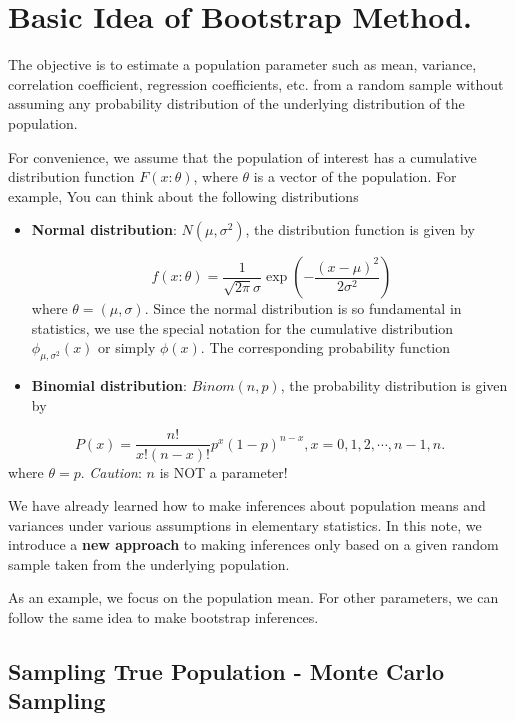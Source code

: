 \documentclass[
]{book}
\begin{document}
\hypertarget{basic-idea-of-bootstrap-method.-1}{%
\section{Basic Idea of Bootstrap Method.}\label{basic-idea-of-bootstrap-method.-1}}

The objective is to estimate a population parameter such as mean, variance, correlation coefficient, regression coefficients, etc. from a random sample without assuming any probability distribution of the underlying distribution of the population.

For convenience, we assume that the population of interest has a cumulative distribution function \(F(x: \theta)\), where \(\theta\) is a vector of the population. For example, You can think about the following distributions

\begin{itemize}
\item
  \textbf{Normal distribution}: \(N(\mu, \sigma^2)\), the distribution function is given by

  \[f(x:\theta) = \frac{1}{\sqrt{2\pi}\sigma}\exp\left(-\frac{(x-\mu)^2}{2\sigma^2}\right)\]
  where \(\theta = (\mu, \sigma)\). Since the normal distribution is so fundamental in statistics, we use the special notation for the cumulative distribution \(\phi_{\mu, \sigma^2}(x)\) or simply \(\phi(x)\). The corresponding probability function
\item
  \textbf{Binomial distribution}: \(Binom(n, p)\), the probability distribution is given by
\end{itemize}

\[ P(x) = \frac{n!}{x!(n-x)!}p^x(1-p)^{n-x}, x = 0, 1, 2, \cdots, n-1, n.\]
where \(\theta = p\). \emph{Caution}: \(n\) is NOT a parameter!

We have already learned how to make inferences about population means and variances under various assumptions in elementary statistics. In this note, we introduce a \textbf{new approach} to making inferences only based on a given random sample taken from the underlying population.

As an example, we focus on the population mean. For other parameters, we can follow the same idea to make bootstrap inferences.

\hypertarget{sampling-true-population---monte-carlo-sampling}{%
\subsection{Sampling True Population - Monte Carlo Sampling}\label{sampling-true-population---monte-carlo-sampling}}
\end{document}

